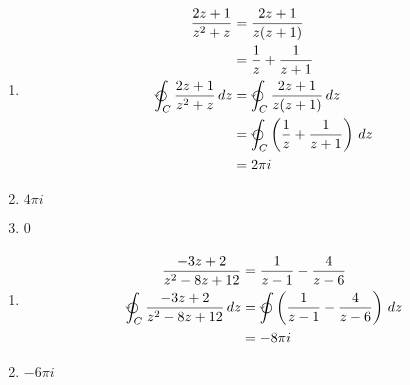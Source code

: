 \documentclass{article}
\begin{document}
\begin{enumerate}
  \item

        \begin{align*}
          \frac{2 z + 1}{z^2 + z}                              & = \frac{2 z + 1}{z (z + 1)}                                                 \\
                                                               & = \frac{1}{z} + \frac{1}{z + 1}                                             \\
          \varointctrclockwise_C \frac{2 z + 1}{z^2 + z} \,d z & = \varointctrclockwise_C \frac{2 z + 1}{z (z + 1)} \,d z                    \\
                                                               & = \varointctrclockwise_C \left( \frac{1}{z} + \frac{1}{z + 1} \right) \,d z \\
                                                               & = 2 \pi i
        \end{align*}

  \item $4 \pi i$

  \item $0$
\end{enumerate}

\setcounter{subsubsection}{16}
\subsubsection{}

\begin{enumerate}
  \item

        \begin{align*}
          \frac{-3 z + 2}{z^2 - 8 z + 12}                              & = \frac{1}{z - 1} - \frac{4}{z - 6}                                           \\
          \varointctrclockwise_C \frac{-3 z + 2}{z^2 - 8 z + 12} \,d z & = \varointctrclockwise \left( \frac{1}{z - 1} - \frac{4}{z - 6} \right) \,d z \\
                                                                       & = -8 \pi i
        \end{align*}

  \item $-6 \pi i$
\end{enumerate}

\setcounter{subsubsection}{18}
\subsubsection{}
\end{document}
